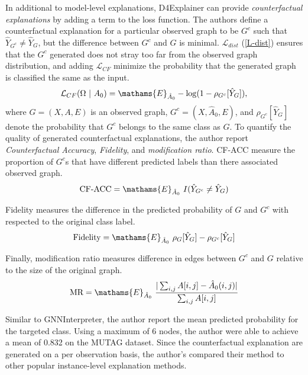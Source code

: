 \documentclass[
  11pt,
  letterpaper,
]{article}
\begin{document}
\quad In additional to model-level explanations, D4Explainer can provide
\emph{counterfactual explanations} by adding a term to the loss
function. The authors define a counterfactual explanation for a
particular observed graph to be \(G^c\) such that
\(\hat Y_{G^c} \neq \hat Y_G\), but the difference between \(G^c\) and
\(G\) is minimal. \(\mathcal{L}_{dist}\) (\ref{L-dist}) ensures that the
\(G^c\) generated does not stray too far from the observed graph
distribution, and adding \(\mathcal{L}_{CF}\) minimize the probability
that the generated graph is classified the same as the input.
\begin{equation}
         \mathcal{L}_{CF}(\Omega \ | \ A_0) = 
            \mathams{E}_{\hat A_0} - \log(1 - \rho_{G^c}[\hat Y_{G}]), 
    \end{equation} where \(G = (X, A, E)\) is an observed graph,
\(G^c = (X, \hat A_0, E)\), and \(\rho_{G^c}[\hat Y_{G}]\) denote the
probability that \(G^c\) belongs to the same class as \(G\). To quantify
the quality of generated counterfactual explanations, the author report
\emph{Counterfactual Accuracy}, \emph{Fidelity}, and \emph{modification
ratio}. CF-ACC measure the proportion of \(G^c\)s that have different
predicted labels than there associated observed graph.\\
\begin{equation}
            \text{CF-ACC} = \mathams{E}_{\hat A_0} \ I(\hat Y_{G^c} \neq \hat Y_{G}) 
    \end{equation}

Fidelity measures the difference in the predicted probability of \(G\)
and \(G^c\) with respected to the original class label.\\
\begin{equation}
        \text{Fidelity} = \mathams{E}_{\hat A_0} \ \rho_{G}[\hat Y_G] - \rho_{G^c}[\hat Y_G]
    \end{equation}

Finally, modification ratio measures difference in edges between \(G^c\)
and \(G\) relative to the size of the original graph.\\
\begin{equation} \label{mod-ratio}
        \text{MR} = \mathams{E}_{\hat A_0} \ \dfrac{|\sum_{i, j} A[i, j] - \hat A_0(i, j)|}{\sum_{i, j} A[i, j]}
    \end{equation}

\quad Similar to GNNInterpreter, the author report the mean predicted
probability for the targeted class. Using a maximum of 6 nodes, the
author were able to achieve a mean of 0.832 on the MUTAG dataset. Since
the counterfactual explanation are generated on a per observation basis,
the author's compared their method to other popular instance-level
explanation methods.
\end{document}

